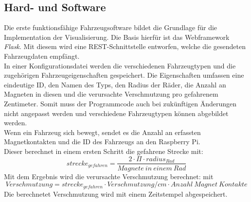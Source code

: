 \documentclass[.../Dokumentation.tex]{subfiles}
\begin{document}
    \subsection{Hard- und Software}
    \label{sec-ita3-hardware}
    Die erste funktionsfähige Fahrzeugsoftware bildet die Grundlage für die Implementation der Visualisierung. Die Basis hierfür ist das Webframework \emph{Flask}. Mit diesem wird eine REST-Schnittstelle entworfen, welche die gesendeten Fahrzeugdaten empfängt. \\
    In einer Konfigurationsdatei werden die verschiedenen Fahrzeugtypen und die zugehörigen Fahrzeugeigenschaften gespeichert. Die Eigenschaften umfassen eine eindeutige ID, den Namen des Typs, den Radius der Räder, die Anzahl an Magneten in diesen und die verursachte Verschmutzung pro gefahrenem Zentimeter. Somit muss der Programmcode auch bei zukünftigen Änderungen nicht angepasst werden und verschiedene Fahrzeugtypen können abgebildet werden.\\
    Wenn ein Fahrzeug sich bewegt, sendet es die Anzahl an erfassten Magnetkontakten und die ID des Fahrzeugs an den Raspberry Pi.\\
    Dieser berechnet in einem ersten Schritt die gefahrene Strecke mit: $$strecke_{gefahren}=\frac{2 \cdot \Pi \cdot  radius_{Rad}}{Magnete \: in \: einem \: Rad}$$ Mit dem Ergebnis wird die verursachte Verschmutzung berechnet: mit $$Verschmutzung = strecke_{gefahren} \cdot Verschmutzung/cm \cdot Anzahl \: Magnet \: Kontakte$$
   	Die berechnetet Verschmutzung wird mit einem Zeitstempel abgespeichert.
    
    
\end{document}
